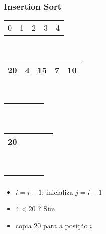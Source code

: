 \documentclass{beamer}
\begin{document}
\begin{frame}
    \frametitle{Insertion Sort}
    \begin{center}
        \begin{table}
            \begin{tabular}{p{0.25cm} p{0.25cm} p{0.25cm} p{0.25cm} p{0.25cm}}
                0 & 1 & 2 & 3 & 4
            \end{tabular} \\
            \begin{tabular}{| p{0.25cm} | p{0.25cm} | p{0.25cm} | p{0.25cm} | p{0.25cm} |}
                \hline
                20 & 4 & 15 & 7 & 10 \\ \hline
            \end{tabular} \\
            \begin{tabular}{p{0.25cm} p{0.25cm} p{0.25cm} p{0.25cm} p{0.25cm}}
                & \color{green}{$\uparrow$} & & &
            \end{tabular} \\
            \begin{tabular}{| p{0.25cm} | p{0.25cm} | p{0.25cm} | p{0.25cm} | p{0.25cm} |}
                \hline
                20 & & & & \\ \hline
            \end{tabular} \\
            \begin{tabular}{p{0.25cm} p{0.25cm} p{0.25cm} p{0.25cm} p{0.25cm}}
                \color{red}{$\uparrow$} & \color{blue}{$\uparrow$} & & &
            \end{tabular}
        \end{table}
	\end{center}
    \color{green}{$ordenando = 4$}
    \begin{itemize}[<+->]
        \item $i = i + 1$; inicializa $j = i - 1$
        \item $4 < 20$ ? Sim
        \item copia $20$ para a posição $i$
    \end{itemize}
\end{frame}
\end{document}
